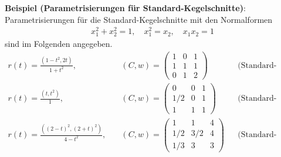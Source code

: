 \linie

\textbf{Beispiel (Parametrisierungen für Standard-Kegelschnitte)}:\\
Parametrisierungen für die Standard-Kegelschnitte mit den Normalformen
\begin{align*}
    x_1^2 + x_2^2 = 1,\quad
    x_1^2 = x_2,\quad
    x_1 x_2 = 1
\end{align*}
sind im Folgenden angegeben.
\begin{align*}
    r(t) = \frac{(1 - t^2, 2t)}{1 + t^2},&\quad
    (C, w) = \begin{pmatrix}1 & 0 & 1\\1 & 1 & 1\\0 & 1 & 2\end{pmatrix}
    &&\text{(Standard-Kreis)}\\
    r(t) = \frac{(t, t^2)}{1},&\quad
    (C, w) = \begin{pmatrix}0 & 0 & 1\\1/2 & 0 & 1\\1 & 1 & 1\end{pmatrix}
    &&\text{(Standard-Parabel)}\\
    r(t) = \frac{((2 - t)^2, (2 + t)^2)}{4 - t^2},&\quad
    (C, w) = \begin{pmatrix}1 & 1 & 4\\1/2 & 3/2 & 4\\1/3 & 3 & 3\end{pmatrix}
    &&\text{(Standard-Hyperbel)}
\end{align*}

\linie
\pagebreak

